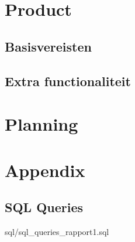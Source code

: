 \documentclass[11pt]{article}
\begin{document}
\section{Product}
  \subsection{Basisvereisten}
  \subsection{Extra functionaliteit}
\section{Planning}
\section{Appendix}
  \subsection{SQL Queries}

{sql/sql_queries_rapport1.sql}
\end{document}
